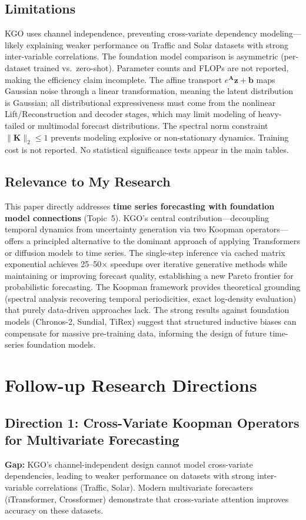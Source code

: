 \documentclass[11pt,a4paper]{article}
\begin{document}
\subsection{Limitations}
KGO uses channel independence, preventing cross-variate dependency modeling---likely explaining weaker performance on Traffic and Solar datasets with strong inter-variable correlations. The foundation model comparison is asymmetric (per-dataset trained vs.\ zero-shot). Parameter counts and FLOPs are not reported, making the efficiency claim incomplete. The affine transport $e^{\mathbf{A}}\mathbf{z} + \mathbf{b}$ maps Gaussian noise through a linear transformation, meaning the latent distribution is Gaussian; all distributional expressiveness must come from the nonlinear Lift/Reconstruction and decoder stages, which may limit modeling of heavy-tailed or multimodal forecast distributions. The spectral norm constraint $\|\mathbf{K}\|_2 \leq 1$ prevents modeling explosive or non-stationary dynamics. Training cost is not reported. No statistical significance tests appear in the main tables.

\subsection{Relevance to My Research}
This paper directly addresses \textbf{time series forecasting with foundation model connections} (Topic~5). KGO's central contribution---decoupling temporal dynamics from uncertainty generation via two Koopman operators---offers a principled alternative to the dominant approach of applying Transformers or diffusion models to time series. The single-step inference via cached matrix exponential achieves 25--50$\times$ speedups over iterative generative methods while maintaining or improving forecast quality, establishing a new Pareto frontier for probabilistic forecasting. The Koopman framework provides theoretical grounding (spectral analysis recovering temporal periodicities, exact log-density evaluation) that purely data-driven approaches lack. The strong results against foundation models (Chronos-2, Sundial, TiRex) suggest that structured inductive biases can compensate for massive pre-training data, informing the design of future time-series foundation models.

\section{Follow-up Research Directions}

\subsection{Direction 1: Cross-Variate Koopman Operators for Multivariate Forecasting}
\textbf{Gap:} KGO's channel-independent design cannot model cross-variate dependencies, leading to weaker performance on datasets with strong inter-variable correlations (Traffic, Solar). Modern multivariate forecasters (iTransformer, Crossformer) demonstrate that cross-variate attention improves accuracy on these datasets.
\end{document}

